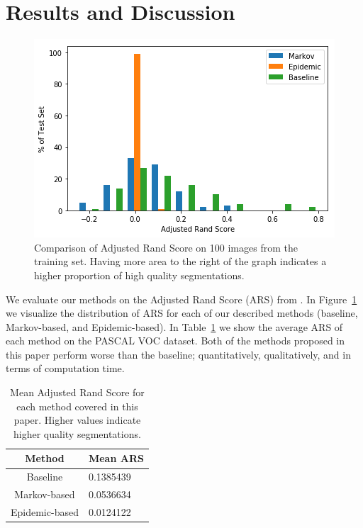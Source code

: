 \documentclass[twocolumn]{article}
\newcommand{\seclab}[1]{\label{sec:#1}}
\newcommand{\figref}[1]{Figure~\ref{fig:#1}}
\newcommand{\figlab}[1]{\label{fig:#1}}
\newcommand{\tblref}[1]{Table~\ref{tbl:#1}}
\newcommand{\tbllab}[1]{\label{tbl:#1}}
\begin{document}
\section{Results and Discussion}\seclab{results}

\begin{figure}[t]
  \centering
  \includegraphics[width=\linewidth]{figs/bars.png}
  \caption{Comparison of Adjusted Rand Score on 100 images from the training
  set. Having more area to the right of the graph indicates a higher proportion
  of high quality segmentations. 
  }
  \figlab{bars}
\end{figure}

We evaluate our methods on the Adjusted Rand Score (ARS) from
\cite{unnikrishnan2005measure}. In \figref{bars} we visualize the distribution
of ARS for each of our described methods (baseline, Markov-based, and
Epidemic-based). In \tblref{ars} we show the average ARS of each method on the
PASCAL VOC dataset. Both of the methods proposed in this paper perform worse
than the baseline; quantitatively, qualitatively, and in terms of computation
time.

\begin{table}
    \centering
    \caption{Mean Adjusted Rand Score for each method covered in this paper.
    Higher values indicate higher quality segmentations.}
    \tbllab{ars}

    \begin{tabular}{c|l}
        Method & Mean ARS \\ \hline
        Baseline & 0.1385439 \\
        Markov-based & 0.0536634 \\
        Epidemic-based & 0.0124122
    \end{tabular}
\end{table}
\end{document}
